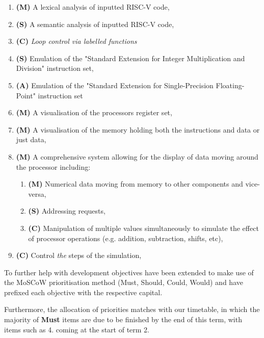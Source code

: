 \documentclass[a4paper,fleqn,twoside,12pt]{article}
\begin{document}
\begin{enumerate}
    \item \textbf{(M)} A lexical analysis of inputted RISC-V code,
    \item \textbf{(S)} A semantic analysis of inputted RISC-V code,
    \item \textbf{(C)} \textit{Loop control via labelled functions}
    \item \textbf{(S)} Emulation of the "Standard Extension for Integer Multiplication and Division" instruction set,
    \item \textbf{(A)} Emulation of the "Standard Extension for Single-Precision Floating-Point" instruction set
    \item \textbf{(M)} A visualisation of the processors register set,
    \item \textbf{(M)} A visualisation of the memory holding both the instructions and data or just data,
    \item \textbf{(M)} A comprehensive system allowing for the display of data moving around the processor including:
    \begin{enumerate}
        \item \textbf{(M)} Numerical data moving from memory to other components and vice-versa,
        \item \textbf{(S)} Addressing requests,
        \item \textbf{(C)} Manipulation of multiple values simultaneously to simulate the effect of processor operations (e.g. addition, subtraction, shifts, etc),
    \end{enumerate}
    \item \textbf{(C)} Control \textit{the} steps of the simulation,
\end{enumerate}

To further help with development objectives have been extended to make use of the MoSCoW prioritisation method \cite{business_2022_chapter} (Must, Should, Could, Would) and have prefixed each objective with the respective capital.

Furthermore, the allocation of priorities matches with our timetable, in which the majority of \textbf{Must} items are due to be finished by the end of this term, with items such as 4. coming at the start of term 2. 
\end{document}
